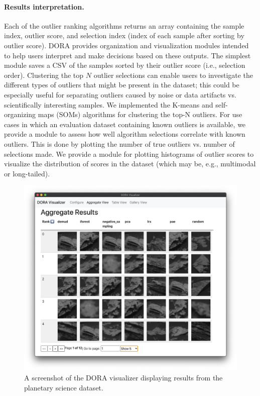 \documentclass[letterpaper]{article} %
\begin{document}
\paragraph{Results interpretation.}
Each of the outlier ranking algorithms returns an array containing the sample
index, outlier score, and selection index (index of each sample after sorting
by outlier score). DORA provides organization and visualization modules
intended to help users interpret and make decisions based on these outputs.
The simplest
 module saves a CSV of the samples sorted by their outlier score 
 (i.e., selection order). Clustering the top
  $N$ outlier selections can enable users to investigate the different types of 
 outliers that might be present in the dataset; this could be especially useful
 for separating outliers caused by noise or data artifacts vs. scientifically 
 interesting samples. We implemented the K-means and self-organizing maps 
 (SOMs) algorithms for clustering the top-N outliers. For use cases in which an
 evaluation dataset containing known outliers is available, we provide a module
 to assess how well algorithm selections correlate with known outliers. This is
 done by plotting the number of true outliers vs. number of selections made. 
We provide a module for plotting histograms of outlier scores to visualize the
 distribution of scores in the dataset (which may be, e.g., multimodal or 
 long-tailed).

\begin{figure}
  \centering
  \includegraphics[width=0.75\linewidth]{figures/doravis.png}
  \caption{A screenshot of the DORA visualizer displaying results from the
  planetary science dataset.}
  \label{fig:doravis}
\end{figure}
\end{document}
